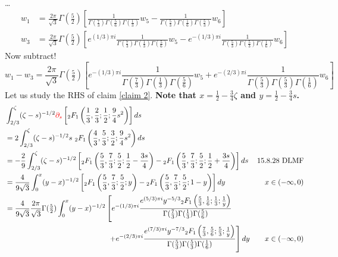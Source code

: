 \documentclass[11pt,a4paper,twoside,leqno,noamsfonts]{amsart}
\numberwithin{equation}{section}
\begin{document}
\begin{example}[Airy]
\begin{align*}
\end{align*}
\ldots
\begin{align*}
w_1 & = \frac{2\pi}{\sqrt{3}} \Gamma(\tfrac{5}{2}) \left[ \frac{1}{\Gamma(\tfrac{7}{3}) \Gamma(\tfrac{5}{6}) \Gamma(\tfrac{1}{3})} w_5 - \frac{1}{\Gamma(\tfrac{5}{3}) \Gamma(\tfrac{1}{6}) \Gamma(\tfrac{5}{3})} w_6 \right] \\
w_3 & = \frac{2\pi}{\sqrt{3}} \Gamma(\tfrac{5}{2}) \left[ e^{(1/3) \pi i} \frac{1}{\Gamma(\tfrac{7}{3}) \Gamma(\tfrac{1}{3}) \Gamma(\tfrac{5}{6})} w_5 - e^{-(1/3) \pi i} \frac{1}{\Gamma(\tfrac{5}{3}) \Gamma(\tfrac{5}{3}) \Gamma(\tfrac{1}{6})} w_6 \right]
\end{align*}
Now subtract!
\[ w_1 - w_3 = \frac{2\pi}{\sqrt{3}} \Gamma(\tfrac{5}{2}) \left[ e^{-(1/3) \pi i} \frac{1}{\Gamma(\tfrac{7}{3}) \Gamma(\tfrac{1}{3}) \Gamma(\tfrac{5}{6})} w_5 + e^{-(2/3) \pi i} \frac{1}{\Gamma(\tfrac{5}{3}) \Gamma(\tfrac{5}{3}) \Gamma(\tfrac{1}{6})} w_6 \right] \]
\color{MidnightBlue}
Let us study the RHS of claim \eqref{claim 2}. \textbf{Note that $x = \tfrac{1}{2} - \tfrac{3}{4} \zeta$ and $y = \tfrac{1}{2} - \tfrac{3}{4} s$.
\begin{align*}
&\int_{2/3}^{\zeta}(\zeta-s)^{-1/2}\textcolor{red}{\partial_s}\left[{}_2F_1\left(\frac{1}{3},\frac{2}{3};\frac{1}{2};\frac{9}{4}s^2\right)\right]ds \\
&= 2\int_{2/3}^{\zeta} (\zeta-s)^{-1/2}s\,\,{}_2F_1\left(\frac{4}{3},\frac{5}{3};\frac{3}{2};\frac{9}{4}s^2\right)ds & \\
&= -\frac{2}{9} \int_{2/3}^{\zeta} (\zeta-s)^{-1/2} \left[ {}_2F_1\left(\frac{5}{3},\frac{7}{3};\frac{5}{2};\frac{1}{2}-\frac{3s}{4}\right) - {}_2F_1\left(\frac{5}{3},\frac{7}{3};\frac{5}{2};\frac{1}{2}+\frac{3s}{4}\right) \right] ds & 15.8.28 \text{ DLMF} \\
&=\frac{4}{9\sqrt{3}}\int_0^x (y-x)^{-1/2}\left[{}_2F_1\left(\frac{5}{3},\frac{7}{3};\frac{5}{2};y\right)-{}_2F_1\left(\frac{5}{3},\frac{7}{3};\frac{5}{2};1-y\right)\right]dy & x\in (-\infty,0) \\
&=\frac{4}{9\sqrt{3}} \frac{2\pi}{\sqrt{3}} \Gamma(\tfrac{5}{2}) \int_0^x (y-x)^{-1/2}\left[ e^{-(1/3) \pi i} \frac{e^{(5/3) \pi i} y^{-5/3} {}_2F_1\left(\frac{5}{3},\frac{1}{6};\frac{1}{3};\frac{1}{y}\right)}{\Gamma(\tfrac{7}{3}) \Gamma(\tfrac{1}{3}) \Gamma(\tfrac{5}{6})} \right. \\
& \qquad\qquad\qquad\qquad\qquad\qquad\qquad \left. + e^{-(2/3) \pi i} \frac{e^{(7/3) \pi i} y^{-7/3} {}_2F_1\left(\frac{7}{3},\frac{5}{6};\frac{5}{3};\frac{1}{y}\right)}{\Gamma(\tfrac{5}{3}) \Gamma(\tfrac{5}{3}) \Gamma(\tfrac{1}{6})} \right]dy & x\in (-\infty,0)

\end{align*}}
\end{example}
\end{document}
